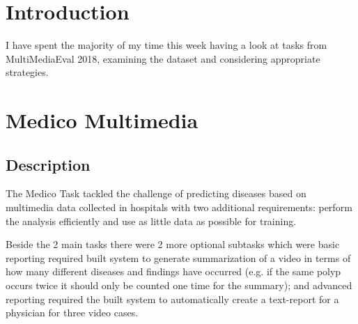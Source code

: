 \section{Introduction}
I have spent the majority of my time this week having a look at tasks from MultiMediaEval 2018\cite{mediaeval18}, examining the dataset and considering appropriate strategies.

\section{Medico Multimedia}\cite{medico18}
\subsection{Description}
The Medico Task tackled the challenge of predicting diseases based on multimedia data collected in hospitals with two additional requirements: perform the analysis efficiently and use as little data as possible for training.

Beside the 2 main tasks there were 2 more optional subtasks which were basic reporting required built system to generate summarization of a video in terms of how many different diseases and findings have occurred (e.g. if the same polyp occurs twice it should only be counted one time for the summary); and advanced reporting required the built system to automatically create a text-report for a physician for three video cases.

